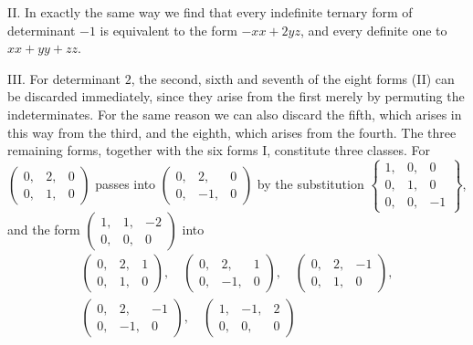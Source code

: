 II. In exactly the same way we find that every indefinite ternary form of determinant \(-1\) is equivalent to the form \(-xx+2yz\), and every definite one to \(xx+yy+zz\).

III. For determinant \(2\), the second, sixth and seventh of the eight forms (II) can be discarded immediately, since they arise from the first merely by permuting the indeterminates. For the same reason we can also discard the fifth, which arises in this way from the third, and the eighth, which arises from the fourth. The three remaining forms, together with the six forms I, constitute three classes. For \(\left(\begin{smallmatrix}0,&2,&0\\0,&1,&0\end{smallmatrix}\right)\) passes into \(\left(\begin{smallmatrix}0,&2,&0\\0,&-1,&0\end{smallmatrix}\right)\) by the substitution \(\left\{\begin{smallmatrix}1,&0,&0\\0,&1,&0\\0,&0,&-1\end{smallmatrix}\right\}\), and the form \(\left(\begin{smallmatrix}1,&1,&-2\\0,&0,&0\end{smallmatrix}\right)\) into
\[
\begin{gathered}
\left(\begin{smallmatrix}0,&2,&1\\0,&1,&0\end{smallmatrix}\right),\quad
\left(\begin{smallmatrix}0,&2,&1\\0,&-1,&0\end{smallmatrix}\right),\quad
\left(\begin{smallmatrix}0,&2,&-1\\0,&1,&0\end{smallmatrix}\right),\\
\left(\begin{smallmatrix}0,&2,&-1\\0,&-1,&0\end{smallmatrix}\right),\quad
\left(\begin{smallmatrix}1,&-1,&2\\0,&0,&0\end{smallmatrix}\right)
\end{gathered}
\]
